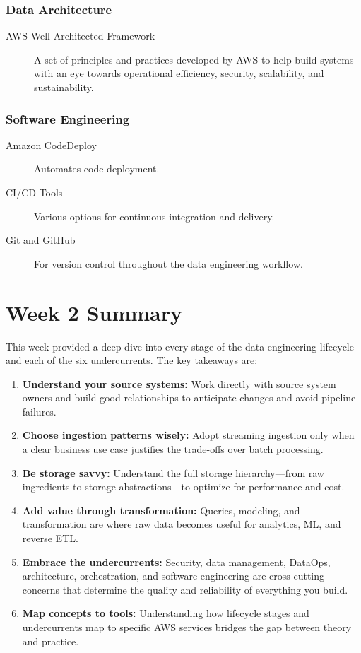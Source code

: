 \documentclass{article}
\begin{document}
\subsubsection{Data Architecture}
\begin{description}
    \item[AWS Well-Architected Framework] A set of principles and practices developed by AWS to help build systems with an eye towards operational efficiency, security, scalability, and sustainability.
\end{description}

\subsubsection{Software Engineering}
\begin{description}
    \item[Amazon CodeDeploy] Automates code deployment.
    \item[CI/CD Tools] Various options for continuous integration and delivery.
    \item[Git and GitHub] For version control throughout the data engineering workflow.
\end{description}

\section{Week 2 Summary}
This week provided a deep dive into every stage of the data engineering lifecycle and each of the six undercurrents. The key takeaways are:
\begin{enumerate}
    \item \textbf{Understand your source systems:} Work directly with source system owners and build good relationships to anticipate changes and avoid pipeline failures.
    \item \textbf{Choose ingestion patterns wisely:} Adopt streaming ingestion only when a clear business use case justifies the trade-offs over batch processing.
    \item \textbf{Be storage savvy:} Understand the full storage hierarchy---from raw ingredients to storage abstractions---to optimize for performance and cost.
    \item \textbf{Add value through transformation:} Queries, modeling, and transformation are where raw data becomes useful for analytics, ML, and reverse ETL.
    \item \textbf{Embrace the undercurrents:} Security, data management, DataOps, architecture, orchestration, and software engineering are cross-cutting concerns that determine the quality and reliability of everything you build.
    \item \textbf{Map concepts to tools:} Understanding how lifecycle stages and undercurrents map to specific AWS services bridges the gap between theory and practice.
\end{enumerate}
\end{document}
